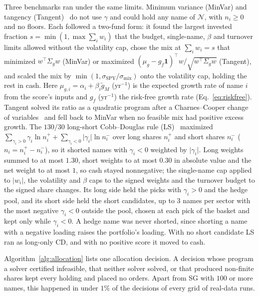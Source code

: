 Three benchmarks ran under the same limits. Minimum variance (MinVar) and tangency
(Tangent)~\cite{markowitz1952, tobin1958} do not use $\gamma$ and could hold any name of $\mathcal{N}$, with
$n_i \ge 0$ and no floors. Each followed a two-fund form: it found the largest invested fraction
$s = \min(1, \max \sum_i w_i)$ that the budget, single-name, $\beta$ and turnover limits allowed without the
volatility cap, chose the mix at $\sum_i w_i = s$ that minimized $w^{\top} \Sigma_g w$ (MinVar) or maximized
$(\mu_g - g_f \mathbf{1})^{\top} w / \sqrt{w^{\top} \Sigma_g w}$ (Tangent), and scaled the mix by
$\min(1, \sigma_{\mathrm{SPY}} / \sigma_{\mathrm{mix}})$ onto the volatility cap, holding the rest in cash. Here
$\mu_{g,i} = \alpha_i + \beta_i \tilde g_M$ (yr$^{-1}$) is the expected growth rate of name $i$ from the score's inputs
and $g_f$ (yr$^{-1}$) the risk-free growth rate (Eq.~\ref{eq:riskfree}). Tangent solved its ratio as a quadratic
program after a Charnes--Cooper change of variables~\cite{charnes1962} and fell back to MinVar when no feasible mix
had positive excess growth. The $130/30$ long-short Cobb--Douglas rule (LS)~\cite{jacobsLevyStarer1998} maximized
$\sum_{\gamma_i > 0} \gamma_i \ln n_i^{+} + \sum_{\gamma_i < 0} \lvert\gamma_i\rvert \ln n_i^{-}$ over long shares
$n_i^{+}$ and short shares $n_i^{-}$ ($n_i = n_i^{+} - n_i^{-}$), so it shorted names with $\gamma_i < 0$ weighted by
$\lvert\gamma_i\rvert$. Long weights summed to at most $1.30$, short weights to at most $0.30$ in absolute value and
the net weight to at most $1$, so cash stayed nonnegative; the single-name cap applied to $\lvert w_i \rvert$, the
volatility and $\beta$ caps to the signed weights and the turnover budget to the signed share changes. Its long side
held the picks with $\gamma_i > 0$ and the hedge pool, and its short side held the short candidates, up to $3$ names
per sector with the most negative $\gamma_i < 0$ outside the pool, chosen at each pick of the basket and kept only
while $\gamma_i < 0$. A hedge name was never shorted, since shorting a name with a negative loading raises the
portfolio's loading. With no short candidate LS ran as long-only CD, and with no positive score it moved to cash.

Algorithm~\ref{alg:allocation} lists one allocation decision. A decision whose program a solver certified
infeasible, that neither solver solved, or that produced non-finite shares kept every holding and placed no orders.
Apart from SG with $100$ or more names, this happened in under $1\%$ of the decisions of every grid of real-data runs.

